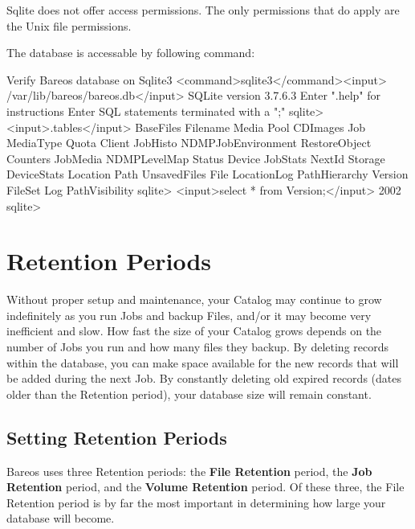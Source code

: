 Sqlite does not offer access permissions. The only permissions that do apply are the Unix file permissions.

The database is accessable by following command:
\begin{commands}{Verify Bareos database on Sqlite3}
<command>sqlite3</command><input> /var/lib/bareos/bareos.db</input>
SQLite version 3.7.6.3
Enter ".help" for instructions
Enter SQL statements terminated with a ";"
sqlite> <input>.tables</input>
BaseFiles           Filename            Media               Pool
CDImages            Job                 MediaType           Quota
Client              JobHisto            NDMPJobEnvironment  RestoreObject
Counters            JobMedia            NDMPLevelMap        Status
Device              JobStats            NextId              Storage
DeviceStats         Location            Path                UnsavedFiles
File                LocationLog         PathHierarchy       Version
FileSet             Log                 PathVisibility
sqlite> <input>select * from Version;</input>
2002
sqlite>
\end{commands}




\section{Retention Periods}

Without proper setup and maintenance, your Catalog may continue to grow
indefinitely as you run Jobs and backup Files, and/or it may become
very inefficient and slow. How fast the size of your
Catalog grows depends on the number of Jobs you run and how many files they
backup. By deleting records within the database, you can make space available
for the new records that will be added during the next Job. By constantly
deleting old expired records (dates older than the Retention period), your
database size will remain constant.


\subsection{Setting Retention Periods}
\label{Retention}

Bareos uses three Retention periods: the {\bf File Retention} period,
the {\bf Job Retention} period, and the {\bf Volume Retention} period. Of
these three, the File Retention period is by far the most important in
determining how large your database will become.

